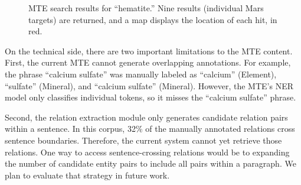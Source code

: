 \documentclass[letterpaper]{article} %
\begin{document}
\begin{figure}
\begin{center}
\end{center}
\caption{MTE search results for ``hematite.''  Nine results
(individual Mars targets) are returned, and a map displays the
location of each hit, in red.}
\label{fig:mtesearch}
\end{figure}

On the technical side, there are two important limitations to the MTE
content.  First, the current MTE cannot generate overlapping
annotations.  For example, the phrase ``calcium sulfate'' was manually
labeled as ``calcium'' (Element), ``sulfate'' (Mineral), and
``calcium sulfate'' (Mineral).  However, the MTE's NER model only
classifies individual tokens, so it misses the ``calcium sulfate''
phrase. 

Second, the relation extraction module only generates candidate
relation pairs within a sentence.  In this corpus, 32\% of the
manually annotated relations cross sentence boundaries.  Therefore,
the current system cannot yet retrieve those relations.  
%
One way to access sentence-crossing relations would be to expanding the
number of candidate entity pairs to include all pairs within a
paragraph.  We plan to evaluate that strategy in future work.
\end{document}

